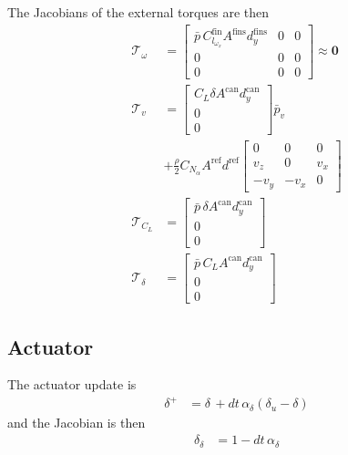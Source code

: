 The Jacobians of the external torques are then
\begin{align}
    \mathcal{T}_\omega &=
    \begin{bmatrix} \bar p \, C^\text{fin}_{l_{\omega_x}} A^\text{fins} d^\text{fins}_y & 0 & 0 \\ 0 & 0 & 0 \\ 0 & 0 & 0  \end{bmatrix} \approx \bm 0
    \\
    \mathcal{T}_v &= 
    \begin{bmatrix} C_L \delta A^\text{can} d^\text{can}_y \\ 0 \\ 0 \end{bmatrix} \bar p_v 
    \\
    &+ \frac{\rho}{2}
    C_{N_\alpha} A^\text{ref} d^\text{ref}
    \begin{bmatrix} 
    0 & 0 & 0 \\
    v_z & 0 & v_x \\
    -v_y & -v_x & 0
    \end{bmatrix}
    \\
    \mathcal{T}_{C_L} &=
    \begin{bmatrix} \bar p \, \delta A^\text{can} d^\text{can}_y  \\ 0 \\ 0 \end{bmatrix} 
    \\
    \mathcal{T}_\delta &=
    \begin{bmatrix} \bar p \, C_L A^\text{can} d^\text{can}_y \\ 0 \\ 0  \end{bmatrix} 
\end{align}

\subsection{Actuator}

The actuator update is 
\begin{align}
    \delta^+ &= \delta \,+ dt \, \alpha_\delta (\delta_u - \delta)
\end{align}
and the Jacobian is then
\begin{align}
    \delta_\delta &= 1 - dt \, \alpha_\delta
\end{align}

